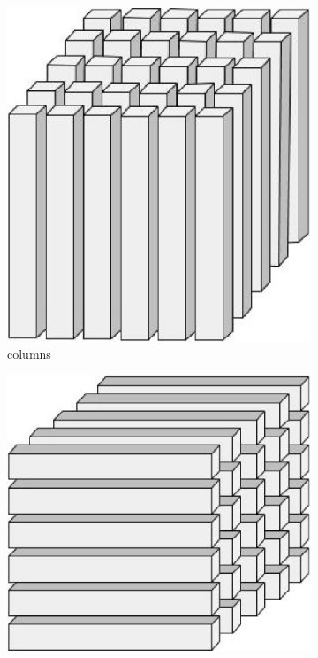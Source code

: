 \documentclass[letterpaper,12pt]{article}
\begin{document}
\begin{figure}[!ht]
 \centering
 \begin{subfigure}[b]{0.29\textwidth}
  \includegraphics[width=\textwidth]{Images/3rd-order-tensor-fiber_mode-1.eps}
  \caption{columns}\label{fig:3tensor-columns}
 \end{subfigure}
 \begin{subfigure}[b]{0.33\textwidth}
  \includegraphics[width=\textwidth]{Images/3rd-order-tensor-fiber_mode-2.eps}

\end{subfigure}
\end{figure}
\end{document}

